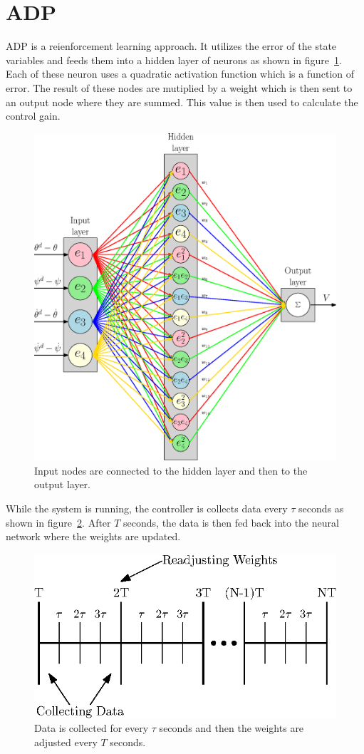 \section{ADP}
ADP is a reienforcement learning approach.  It utilizes the error of the state variables and feeds them into a hidden layer of neurons as shown in figure~\ref{fig:ADP_Neural_Network}.  Each of these neuron uses a quadratic activation function which is a function of error.  The result of these nodes are mutiplied by a weight which is then sent to an output node where they are summed.  This value is then used to calculate the control gain. 
\begin{figure}[!htbp]
    \centering
    \includegraphics[width=.46\textwidth,keepaspectratio=true]{figs/ipe/ADP_Neural_Network.eps}
    \caption{Input nodes are connected to the hidden layer and then to the output layer.}
    \label{fig:ADP_Neural_Network}
\end{figure}
While the system is running, the controller is collects data every $\tau$ seconds as shown in figure~\ref{fig:ADP_Samples}.  After $T$ seconds, the data is then fed back into the neural network where the weights are updated.
\begin{figure}[!htbp]
    \centering
    \includegraphics[width=.46\textwidth,keepaspectratio=true]{figs/ipe/ADP_Samples.eps}
    \caption{Data is collected for every $\tau$ seconds and then the weights are adjusted every $T$ seconds.}
    \label{fig:ADP_Samples}
\end{figure}

